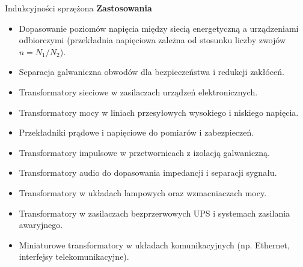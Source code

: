 \begin{frame}{Indukcyjności sprzężona}
	\textbf{Zastosowania}\\
	\begin{itemize}
		\item[\bt] Dopasowanie poziomów napięcia między siecią energetyczną a urządzeniami odbiorczymi (przekładnia napięciowa zależna od stosunku liczby zwojów $n = N_1/N_2$).
		\item[\bt] Separacja galwaniczna obwodów dla bezpieczeństwa i redukcji zakłóceń.
		\item[\bt] Transformatory sieciowe w zasilaczach urządzeń elektronicznych.
		\item[\bt] Transformatory mocy w liniach przesyłowych wysokiego i niskiego napięcia.
		\item[\bt] Przekładniki prądowe i napięciowe do pomiarów i zabezpieczeń.
		\item[\bt] Transformatory impulsowe w przetwornicach z izolacją galwaniczną.
		\item[\bt] Transformatory audio do dopasowania impedancji i separacji sygnału.
		\item[\bt] Transformatory w układach lampowych oraz wzmacniaczach mocy.
		\item[\bt] Transformatory w zasilaczach bezprzerwowych UPS i systemach zasilania awaryjnego.
		\item[\bt] Miniaturowe transformatory w układach komunikacyjnych (np. Ethernet, interfejsy telekomunikacyjne).
	\end{itemize}
\end{frame}